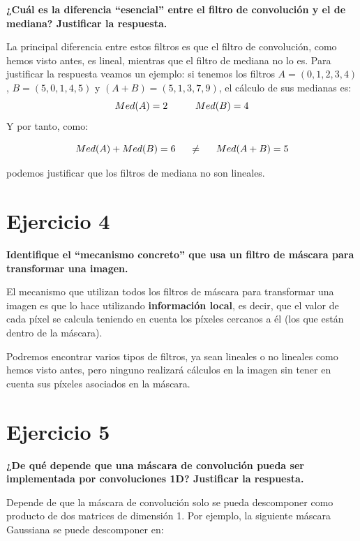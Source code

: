 \documentclass[11pt,a4paper]{article}
\begin{document}
\textbf{¿Cuál es la diferencia “esencial” entre el filtro de convolución y el de mediana? Justificar la respuesta.}

La principal diferencia entre estos filtros es que el filtro de convolución, como hemos visto antes, es lineal, mientras que el
filtro de mediana no lo es. Para justificar la respuesta veamos un ejemplo: si tenemos los filtros $A=(0,1,2,3,4)$, $B=(5,0,1,4,5)$
y $(A+B)=(5,1,3,7,9)$, el cálculo de sus medianas es:
\begin{equation}
Med(A) = 2 \hspace{10mm} Med(B) = 4
\end{equation}
Y por tanto, como:

\begin{equation}
Med(A)+Med(B)=6 \hspace{5mm} \neq \hspace{5mm} Med(A+B)=5
\end{equation}

podemos justificar que los filtros de mediana no son lineales.

\newpage


\section*{Ejercicio 4}

\textbf{Identifique el “mecanismo concreto” que usa un filtro de máscara para transformar una imagen.}

El mecanismo que utilizan todos los filtros de máscara para transformar una imagen es que lo hace utilizando \textbf{información local},
es decir, que el valor de cada píxel se calcula teniendo en cuenta los píxeles cercanos a él (los que están dentro de la máscara).

Podremos encontrar varios tipos de filtros, ya sean lineales o no lineales como hemos visto antes, pero ninguno realizará cálculos
en la imagen sin tener en cuenta sus píxeles asociados en la máscara.

\section*{Ejercicio 5}

\textbf{¿De qué depende que una máscara de convolución pueda ser implementada por convoluciones 1D? Justificar la respuesta.}

Depende de que la máscara de convolución solo se pueda descomponer como producto de dos matrices de dimensión 1. Por ejemplo,
la siguiente máscara Gaussiana se puede descomponer en:
\end{document}
